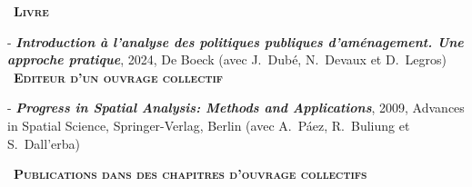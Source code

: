 \documentclass[a4paper,12pt]{article}
\newcommand{\smalltitre}[1]{%
	\noindent \textbullet~\textsc{\textbf{#1}}
	\smallskip
	}
\begin{document}

\smalltitre{Livre} \medskip

\noindent - \textit{\textbf{Introduction à l'analyse des politiques publiques d'aménagement. Une approche pratique}}, 2024, De Boeck (avec J.~Dubé, N.~Devaux et D.~Legros) \\

\smalltitre{Editeur d'un ouvrage collectif} \medskip

\noindent - \textit{\textbf{Progress in Spatial Analysis: Methods and Applications}}, 2009, Advances in Spatial Science, Springer-Verlag, Berlin (avec A.~Páez, R.~Buliung et S.~Dall'erba) \\

\newpage


\smalltitre{Publications dans des chapitres d'ouvrage collectifs}\medskip
\end{document}
